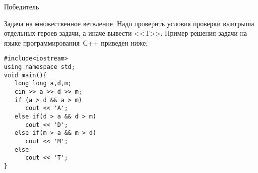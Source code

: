 \begin{tutorial}{Победитель}

Задача на множественное ветвление. Надо проверить условия проверки выигрыша отдельных героев задачи, а иначе вывести <<T>>. Пример решения задачи на языке программирования~С++ приведен ниже:
\begin{verbatim}
#include<iostream>
using namespace std;
void main(){
   long long a,d,m;
   cin >> a >> d >> m;
   if (a > d && a > m)
      cout << 'A';
   else if(d > a && d > m)
      cout << 'D';
   else if(m > a && m > d)
      cout << 'M';
   else
      cout << 'T';
}
\end{verbatim}

\end{tutorial}
